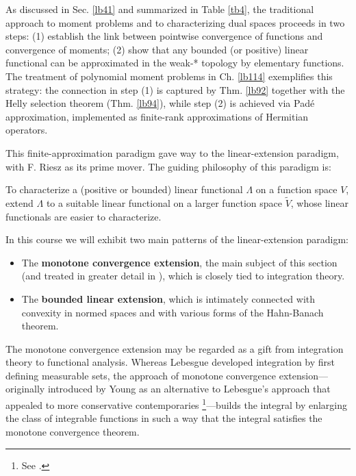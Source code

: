 \documentclass[12pt,b5paper,notitlepage]{article}
\theoremstyle{definition}
\theoremstyle{plain}
\newcommand{\wtd}{\widetilde}
\numberwithin{equation}{section}
\begin{document}
As discussed in Sec. \ref{lb41} and summarized in Table \ref{tb4}, the traditional approach to moment problems and to characterizing dual spaces proceeds in two steps: (1) establish the link between pointwise convergence of functions and convergence of moments; (2) show that any bounded (or positive) linear functional can be approximated in the weak-* topology by elementary functions. The treatment of polynomial moment problems in Ch. \ref{lb114} exemplifies this strategy: the connection in step (1) is captured by Thm. \ref{lb92} together with the Helly selection theorem (Thm. \ref{lb94}), while step (2) is achieved via Pad\'e approximation, implemented as finite-rank approximations of Hermitian operators.


This finite-approximation paradigm gave way to the linear-extension paradigm, with F. Riesz as its prime mover. The guiding philosophy of this paradigm is:
\begin{tcolorbox}
To characterize a (positive or bounded) linear functional $\Lambda$ on a function space $V$, extend $\Lambda$ to a suitable linear functional on a larger function space $\wtd V$, whose linear functionals are easier to characterize.
\end{tcolorbox}




In this course we will exhibit two main patterns of the linear-extension paradigm:
\begin{itemize}
\item The \textbf{monotone convergence extension}, the main subject of this section (and treated in greater detail in \cite[Ch.  24-25]{Gui-A}), which is closely tied to integration theory.
\item The \textbf{bounded linear extension}, which is intimately connected with convexity in normed spaces and with various forms of the Hahn-Banach theorem.
\end{itemize}
The monotone convergence extension may be regarded as a gift from integration theory to functional analysis. Whereas Lebesgue developed integration by first defining measurable sets, the approach of monotone convergence extension---originally introduced by Young \cite{You10,You13} as an alternative to Lebesgue's approach that appealed to more conservative contemporaries \footnote{See \cite[Sec.~6.6]{Pes}.}---builds the integral by enlarging the class of integrable functions in such a way that the integral satisfies the monotone convergence theorem.
\end{document}
